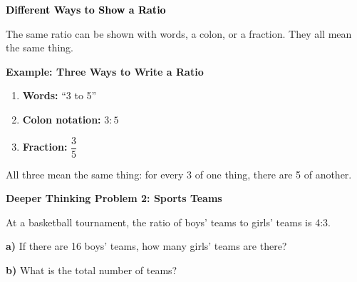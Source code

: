 \documentclass[12pt, letterpaper, fleqn]{article}
\begin{document}
\newpage

\begin{tcolorbox}[colback=customteal!20]
\large\textcolor{black}{\textbf{Different Ways to Show a Ratio}}
\end{tcolorbox}

\noindent
The same ratio can be shown with words, a colon, or a fraction. They all mean the same thing.

\vspace{3mm}

\begin{tcolorbox}[colback=white, colframe=black!25, boxrule=0.6pt, arc=4mm, left=6mm, right=6mm, top=5mm, bottom=5mm]

\textbf{Example: Three Ways to Write a Ratio}

\medskip

\begin{enumerate}
    \item \textbf{Words:} ``3 to 5''
    \item \textbf{Colon notation:} $3:5$
    \item \textbf{Fraction:} $\dfrac{3}{5}$
\end{enumerate}

\medskip

\noindent
All three mean the same thing: for every 3 of one thing, there are 5 of another.

\end{tcolorbox}

\vspace{4mm}

\begin{tcolorbox}[colback=yellow!15, colframe=orange, boxrule=1.5pt, arc=4mm, left=6mm, right=6mm, top=5mm, bottom=5mm]

\textbf{Deeper Thinking Problem 2: Sports Teams}

\medskip

\noindent
At a basketball tournament, the ratio of boys' teams to girls' teams is 4:3.

\noindent
\textbf{a)} If there are 16 boys' teams, how many girls' teams are there?

\vspace{1.8cm}

\noindent
\textbf{b)} What is the total number of teams?

\vspace{1.8cm}

\end{tcolorbox}
\end{document}
